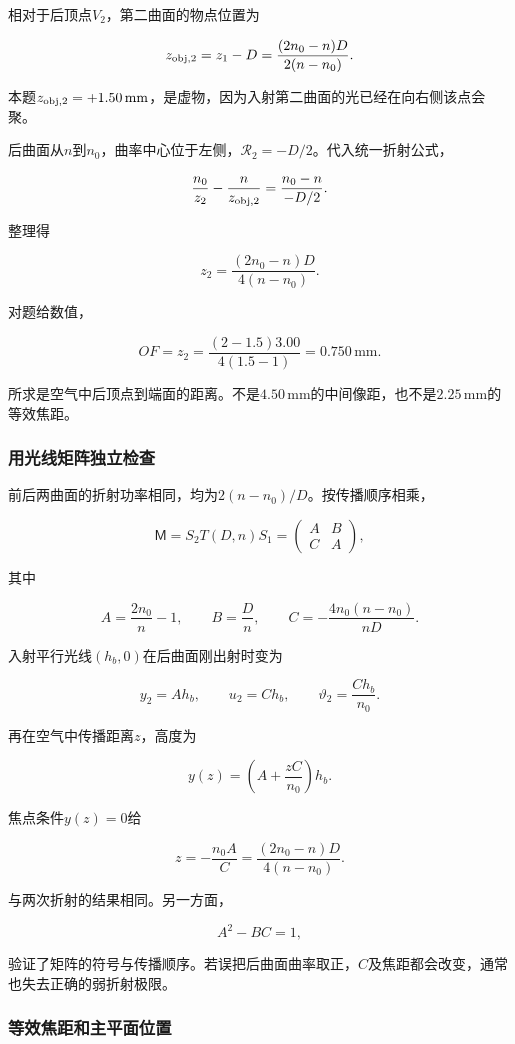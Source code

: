 \documentclass[12pt,a4paper,fontset=fandol]{ctexart}
\begin{document}
相对于后顶点\(V_2\)，第二曲面的物点位置为

\[
z_{\rm obj,2}=z_1-D
=\frac{(2n_0-n)D}{2(n-n_0)}.
\]

本题\(z_{\rm obj,2}=+1.50\,\mathrm{mm}\)，是虚物，因为入射第二曲面的光已经在向右侧该点会聚。

后曲面从\(n\)到\(n_0\)，曲率中心位于左侧，\(\mathcal R_2=-D/2\)。代入统一折射公式，

\[
\frac{n_0}{z_2}
-\frac{n}{z_{\rm obj,2}}
=\frac{n_0-n}{-D/2}.
\]

整理得

\[
\boxed{
z_2=\frac{(2n_0-n)D}{4(n-n_0)}}.
\]

对题给数值，

\[
\boxed{
OF=z_2=\frac{(2-1.5)3.00}{4(1.5-1)}
=0.750\,\mathrm{mm}}.
\]

所求是空气中后顶点到端面的距离。不是\(4.50\,\mathrm{mm}\)的中间像距，也不是\(2.25\,\mathrm{mm}\)的等效焦距。

\subsubsection{用光线矩阵独立检查}\label{ux7528ux5149ux7ebfux77e9ux9635ux72ecux7acbux68c0ux67e5}

前后两曲面的折射功率相同，均为\(2(n-n_0)/D\)。按传播顺序相乘，

\[
\mathsf M=S_2T(D,n)S_1
=\begin{pmatrix}A&B\\C&A\end{pmatrix},
\]

其中

\[
A=\frac{2n_0}{n}-1,\qquad
B=\frac Dn,\qquad
C=-\frac{4n_0(n-n_0)}{nD}.
\]

入射平行光线\((h_b,0)\)在后曲面刚出射时变为

\[
y_2=Ah_b,\qquad
u_2=Ch_b,\qquad
\vartheta_2=\frac{Ch_b}{n_0}.
\]

再在空气中传播距离\(z\)，高度为

\[
y(z)=\left(A+\frac{zC}{n_0}\right)h_b.
\]

焦点条件\(y(z)=0\)给

\[
z=-\frac{n_0A}{C}
=\frac{(2n_0-n)D}{4(n-n_0)}.
\]

与两次折射的结果相同。另一方面，

\[
A^2-BC=1,
\]

验证了矩阵的符号与传播顺序。若误把后曲面曲率取正，\(C\)及焦距都会改变，通常也失去正确的弱折射极限。

\subsubsection{等效焦距和主平面位置}\label{ux7b49ux6548ux7126ux8dddux548cux4e3bux5e73ux9762ux4f4dux7f6e}
\end{document}
